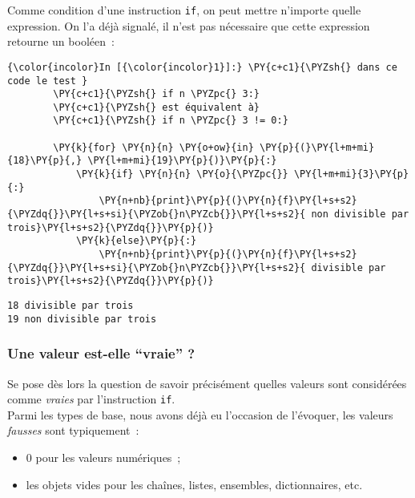     Comme condition d'une instruction \texttt{if}, on peut mettre n'importe
quelle expression. On l'a déjà signalé, il n'est pas nécessaire que
cette expression retourne un booléen~:

    \begin{Verbatim}[commandchars=\\\{\}]
{\color{incolor}In [{\color{incolor}1}]:} \PY{c+c1}{\PYZsh{} dans ce code le test }
        \PY{c+c1}{\PYZsh{} if n \PYZpc{} 3:}
        \PY{c+c1}{\PYZsh{} est équivalent à}
        \PY{c+c1}{\PYZsh{} if n \PYZpc{} 3 != 0:}
        
        \PY{k}{for} \PY{n}{n} \PY{o+ow}{in} \PY{p}{(}\PY{l+m+mi}{18}\PY{p}{,} \PY{l+m+mi}{19}\PY{p}{)}\PY{p}{:}
            \PY{k}{if} \PY{n}{n} \PY{o}{\PYZpc{}} \PY{l+m+mi}{3}\PY{p}{:}
                \PY{n+nb}{print}\PY{p}{(}\PY{n}{f}\PY{l+s+s2}{\PYZdq{}}\PY{l+s+si}{\PYZob{}n\PYZcb{}}\PY{l+s+s2}{ non divisible par trois}\PY{l+s+s2}{\PYZdq{}}\PY{p}{)}
            \PY{k}{else}\PY{p}{:}
                \PY{n+nb}{print}\PY{p}{(}\PY{n}{f}\PY{l+s+s2}{\PYZdq{}}\PY{l+s+si}{\PYZob{}n\PYZcb{}}\PY{l+s+s2}{ divisible par trois}\PY{l+s+s2}{\PYZdq{}}\PY{p}{)}
\end{Verbatim}


    \begin{Verbatim}[commandchars=\\\{\}]
18 divisible par trois
19 non divisible par trois

    \end{Verbatim}

    \hypertarget{une-valeur-est-elle-vraie}{%
\subsubsection{Une valeur est-elle ``vraie''
?}\label{une-valeur-est-elle-vraie}}

    Se pose dès lors la question de savoir précisément quelles valeurs sont
considérées comme \emph{vraies} par l'instruction \texttt{if}.\\

Parmi les types de base, nous avons déjà eu l'occasion de l'évoquer, les
valeurs \emph{fausses} sont typiquement~:

\begin{itemize}
	\item 
	0 pour les valeurs numériques~;
	\item
	les objets vides pour les chaînes, listes, ensembles,
	dictionnaires, etc.
\end{itemize}

